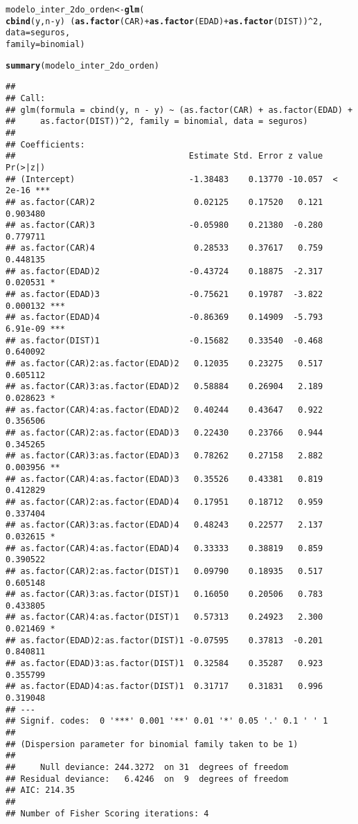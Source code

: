\documentclass[paper=letter, fontsize=11pt]{scrartcl}\usepackage[]{graphicx}\usepackage[]{xcolor}
\makeatletter
\newcommand{\hlnum}[1]{\textcolor[rgb]{0.686,0.059,0.569}{#1}}%
\newcommand{\hlopt}[1]{\textcolor[rgb]{0,0,0}{#1}}%
\newcommand{\hldef}[1]{\textcolor[rgb]{0.345,0.345,0.345}{#1}}%
\newcommand{\hlkwb}[1]{\textcolor[rgb]{0.69,0.353,0.396}{#1}}%
\newcommand{\hlkwc}[1]{\textcolor[rgb]{0.333,0.667,0.333}{#1}}%
\newcommand{\hlkwd}[1]{\textcolor[rgb]{0.737,0.353,0.396}{\textbf{#1}}}%
\newenvironment{kframe}{%
 \def\at@end@of@kframe{}%
 \ifinner\ifhmode%
  \def\at@end@of@kframe{\end{minipage}}%
  \begin{minipage}{\columnwidth}%
 \fi\fi%
 \def\FrameCommand##1{\hskip\@totalleftmargin \hskip-\fboxsep
 \colorbox{shadecolor}{##1}\hskip-\fboxsep
     \hskip-\linewidth \hskip-\@totalleftmargin \hskip\columnwidth}%
 \MakeFramed {\advance\hsize-\width
   \@totalleftmargin\z@ \linewidth\hsize
   \@setminipage}}%
 {\par\unskip\endMakeFramed%
 \at@end@of@kframe}
\newenvironment{knitrout}{}{} %
\numberwithin{equation}{problemcounter} %
\numberwithin{figure}{problemcounter} %
\numberwithin{table}{problemcounter} %
\numberwithin{subsection}{problemcounter}
\makeatother
\begin{document}
\begin{knitrout}
\color{fgcolor}\begin{kframe}
\begin{alltt}
\hldef{modelo_inter_2do_orden} \hlkwb{<-} \hlkwd{glm}\hldef{(}
    \hlkwd{cbind}\hldef{(y, n} \hlopt{-} \hldef{y)} \hlopt{~} \hldef{(}\hlkwd{as.factor}\hldef{(CAR)} \hlopt{+} \hlkwd{as.factor}\hldef{(EDAD)} \hlopt{+} \hlkwd{as.factor}\hldef{(DIST))}\hlopt{^}\hlnum{2}\hldef{,}
    \hlkwc{data} \hldef{= seguros,}
    \hlkwc{family} \hldef{= binomial)}

\hlkwd{summary}\hldef{(modelo_inter_2do_orden)}
\end{alltt}
\begin{verbatim}
## 
## Call:
## glm(formula = cbind(y, n - y) ~ (as.factor(CAR) + as.factor(EDAD) + 
##     as.factor(DIST))^2, family = binomial, data = seguros)
## 
## Coefficients:
##                                   Estimate Std. Error z value Pr(>|z|)    
## (Intercept)                       -1.38483    0.13770 -10.057  < 2e-16 ***
## as.factor(CAR)2                    0.02125    0.17520   0.121 0.903480    
## as.factor(CAR)3                   -0.05980    0.21380  -0.280 0.779711    
## as.factor(CAR)4                    0.28533    0.37617   0.759 0.448135    
## as.factor(EDAD)2                  -0.43724    0.18875  -2.317 0.020531 *  
## as.factor(EDAD)3                  -0.75621    0.19787  -3.822 0.000132 ***
## as.factor(EDAD)4                  -0.86369    0.14909  -5.793 6.91e-09 ***
## as.factor(DIST)1                  -0.15682    0.33540  -0.468 0.640092    
## as.factor(CAR)2:as.factor(EDAD)2   0.12035    0.23275   0.517 0.605112    
## as.factor(CAR)3:as.factor(EDAD)2   0.58884    0.26904   2.189 0.028623 *  
## as.factor(CAR)4:as.factor(EDAD)2   0.40244    0.43647   0.922 0.356506    
## as.factor(CAR)2:as.factor(EDAD)3   0.22430    0.23766   0.944 0.345265    
## as.factor(CAR)3:as.factor(EDAD)3   0.78262    0.27158   2.882 0.003956 ** 
## as.factor(CAR)4:as.factor(EDAD)3   0.35526    0.43381   0.819 0.412829    
## as.factor(CAR)2:as.factor(EDAD)4   0.17951    0.18712   0.959 0.337404    
## as.factor(CAR)3:as.factor(EDAD)4   0.48243    0.22577   2.137 0.032615 *  
## as.factor(CAR)4:as.factor(EDAD)4   0.33333    0.38819   0.859 0.390522    
## as.factor(CAR)2:as.factor(DIST)1   0.09790    0.18935   0.517 0.605148    
## as.factor(CAR)3:as.factor(DIST)1   0.16050    0.20506   0.783 0.433805    
## as.factor(CAR)4:as.factor(DIST)1   0.57313    0.24923   2.300 0.021469 *  
## as.factor(EDAD)2:as.factor(DIST)1 -0.07595    0.37813  -0.201 0.840811    
## as.factor(EDAD)3:as.factor(DIST)1  0.32584    0.35287   0.923 0.355799    
## as.factor(EDAD)4:as.factor(DIST)1  0.31717    0.31831   0.996 0.319048    
## ---
## Signif. codes:  0 '***' 0.001 '**' 0.01 '*' 0.05 '.' 0.1 ' ' 1
## 
## (Dispersion parameter for binomial family taken to be 1)
## 
##     Null deviance: 244.3272  on 31  degrees of freedom
## Residual deviance:   6.4246  on  9  degrees of freedom
## AIC: 214.35
## 
## Number of Fisher Scoring iterations: 4
\end{verbatim}
\end{kframe}
\end{knitrout}
\end{document}
